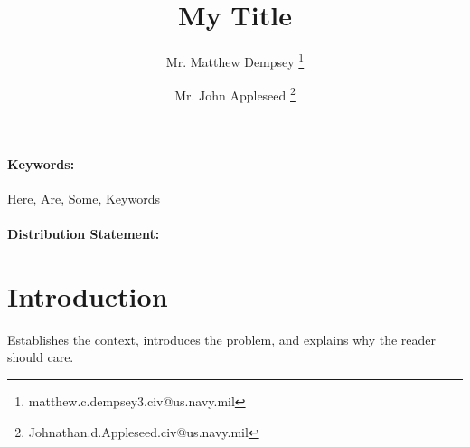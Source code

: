 \documentclass[twocolumn]{article}
\begin{document}

\title{My Title}

\author[1]{
    Mr. Matthew Dempsey
    \thanks{matthew.c.dempsey3.civ@us.navy.mil}
    }
\author[1]{
    Mr. John Appleseed
    \thanks{Johnathan.d.Appleseed.civ@us.navy.mil}
    }

\begin{titlepage}
    \centering
    
    \maketitle

    \thispagestyle{fancy}
    
    \begin{abstract}

        \limsup[1]
            
    \end{abstract}

    \paragraph{Keywords:} 
    Here, Are, Some, Keywords

    \paragraph{Distribution Statement:}
    \lipsum[1]

    \newpage

    \tableofcontents
    \listoffigures
    \listoftables

\end{titlepage}


\section{Introduction}

Establishes the context, introduces the problem, and explains why the reader should care.

\lipsum[1]
\end{document}

